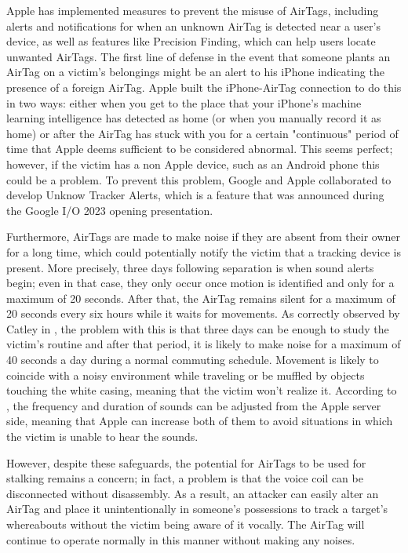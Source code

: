 \documentclass[english]{article}
\begin{document}
Apple has implemented measures to prevent the misuse of AirTags, including alerts and notifications for when an unknown AirTag is detected near a user's device, as well as features like Precision Finding, which can help users locate unwanted AirTags. The first line of defense in the event that someone plants an AirTag on a victim's belongings might be an alert to his iPhone indicating the presence of a foreign AirTag. Apple built the iPhone-AirTag connection to do this in two ways: either when you get to the place that your iPhone's machine learning intelligence has detected as home (or when you manually record it as home) or after the AirTag has stuck with you for a certain "continuous" period of time that Apple deems sufficient to be considered abnormal. This seems perfect; however, if the victim has a non Apple device, such as an Android phone this could be a problem. To prevent this problem, Google and Apple collaborated to develop Unknow Tracker Alerts, which is a feature that was announced during the Google I/O 2023 opening presentation.

Furthermore, AirTags are made to make noise if they are absent from their owner for a long time, which could potentially notify the victim that a tracking device is present. More precisely, three days following separation is when sound alerts begin; even in that case, they only occur once motion is identified and only for a maximum of 20 seconds. After that, the AirTag remains silent for a maximum of 20 seconds every six hours while it waits for movements. As correctly observed by Catley in \cite{reverse}, the problem with this is that three days can be enough to study the victim's routine and after that period, it is likely to make noise for a maximum of 40 seconds a day during a normal commuting schedule. Movement is likely to coincide with a noisy environment while traveling or be muffled by objects touching the white casing, meaning that the victim won't realize it. According to \cite{server}, the frequency and duration of sounds can be adjusted from the Apple server side, meaning that Apple can increase both of them to avoid situations in which the victim is unable to hear the sounds.

However, despite these safeguards, the potential for AirTags to be used for stalking remains a concern; in fact, a problem is that the voice coil can be disconnected without disassembly. As a result, an attacker can easily alter an AirTag and place it unintentionally in someone's possessions to track a target's whereabouts without the victim being aware of it vocally. The AirTag will continue to operate normally in this manner without making any noises.
\end{document}
